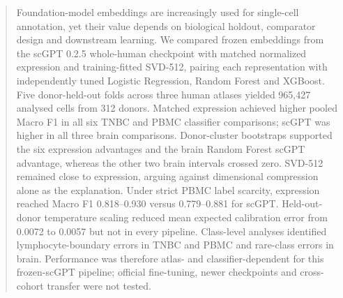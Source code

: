 \begin{abstract}
Foundation-model embeddings are increasingly used for single-cell annotation, yet their value depends on biological holdout, comparator design and downstream learning. We compared frozen embeddings from the scGPT 0.2.5 whole-human checkpoint with matched normalized expression and training-fitted SVD-512, pairing each representation with independently tuned Logistic Regression, Random Forest and XGBoost. Five donor-held-out folds across three human atlases yielded 965,427 analysed cells from 312 donors. Matched expression achieved higher pooled Macro F1 in all six TNBC and PBMC classifier comparisons; scGPT was higher in all three brain comparisons. Donor-cluster bootstraps supported the six expression advantages and the brain Random Forest scGPT advantage, whereas the other two brain intervals crossed zero. SVD-512 remained close to expression, arguing against dimensional compression alone as the explanation. Under strict PBMC label scarcity, expression reached Macro F1 0.818--0.930 versus 0.779--0.881 for scGPT. Held-out-donor temperature scaling reduced mean expected calibration error from 0.0072 to 0.0057 but not in every pipeline. Class-level analyses identified lymphocyte-boundary errors in TNBC and PBMC and rare-class errors in brain. Performance was therefore atlas- and classifier-dependent for this frozen-scGPT pipeline; official fine-tuning, newer checkpoints and cross-cohort transfer were not tested.
\end{abstract}
